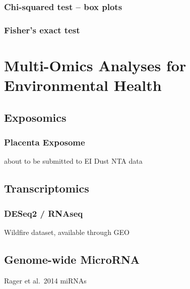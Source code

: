 \documentclass[
]{book}
\begin{document}
\hypertarget{chi-squared-test-box-plots}{%
\subsection{Chi-squared test -- box plots}\label{chi-squared-test-box-plots}}

\hypertarget{fishers-exact-test}{%
\subsection{Fisher's exact test}\label{fishers-exact-test}}

\hypertarget{multi-omics-analyses-for-environmental-health}{%
\chapter{Multi-Omics Analyses for Environmental Health}\label{multi-omics-analyses-for-environmental-health}}

\hypertarget{exposomics}{%
\section{Exposomics}\label{exposomics}}

\hypertarget{placenta-exposome}{%
\subsection{Placenta Exposome}\label{placenta-exposome}}

about to be submitted to EI
Dust NTA data

\hypertarget{transcriptomics}{%
\section{Transcriptomics}\label{transcriptomics}}

\hypertarget{deseq2-rnaseq}{%
\subsection{DESeq2 / RNAseq}\label{deseq2-rnaseq}}

Wildfire dataset, available through GEO

\hypertarget{genome-wide-microrna}{%
\section{Genome-wide MicroRNA}\label{genome-wide-microrna}}

Rager et al.~2014 miRNAs
\end{document}
